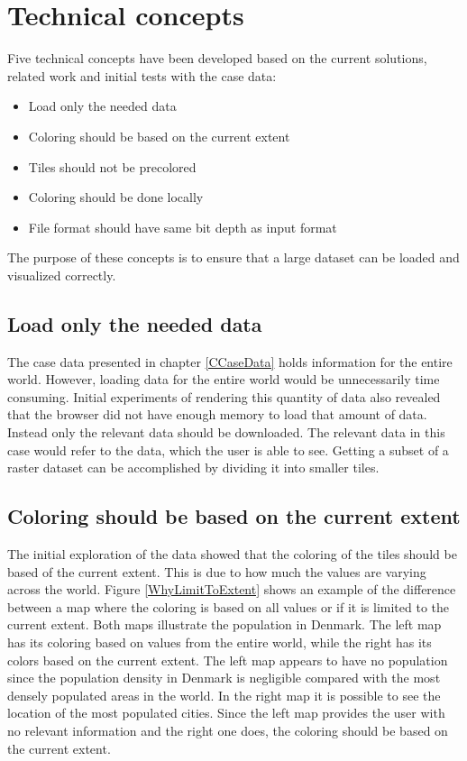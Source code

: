 
\chapter{Technical concepts}\label{CCoreConcepts}
Five technical concepts have been developed based on the current solutions, related work and initial tests with the case data:
\begin{itemize}
	\item Load only the needed data
	\item Coloring should be based on the current extent
	\item Tiles should not be precolored
	\item Coloring should be done locally
	\item File format should have same bit depth as input format
\end{itemize}

The purpose of these concepts is to ensure that a large dataset can be loaded and visualized correctly. 

\section{Load only the needed data}
The case data presented in chapter \ref{CCaseData} holds information for the entire world. However, loading data for the entire world would be unnecessarily time consuming. Initial experiments of rendering this quantity of data also revealed that the browser did not have enough memory to load that amount of data. Instead only the relevant data should be downloaded. The relevant data in this case would refer to the data, which the user is able to see. Getting a subset of a raster dataset can be accomplished by dividing it into smaller tiles. 

\section{Coloring should be based on the current extent}\label{ColorFromCurrentExtent}
The initial exploration of the data showed that the coloring of the tiles should be based of the current extent. This is due to how much the values are varying across the world. Figure \ref{WhyLimitToExtent} shows an example of the difference between a map where the coloring is based on all values or if it is limited to the current extent. Both maps illustrate the population in Denmark. The left map has its coloring based on values from the entire world, while the right has its colors based on the current extent. The left map appears to have no population since the population density in Denmark is negligible compared with the most densely populated areas in the world. In the right map it is possible to see the location of the most populated cities. Since the left map provides the user with no relevant information and the right one does, the coloring should be based on the current extent.


